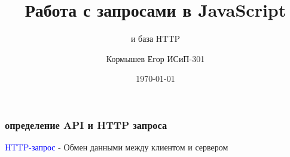 \documentclass[aspectratio=169]{beamer}
\title{Работа с запросами в JavaScript}
\subtitle{и база HTTP}
\author{Кормышев Егор ИСиП-301}
\date{\today}
\begin{document}
\frame{\titlepage}


\begin{frame}
  \frametitle{определение API и HTTP запроса}

  \large \textcolor{blue}{HTTP-запрос} - \normalsize Обмен данными между клиентом и сервером
\end{frame}
\end{document}
